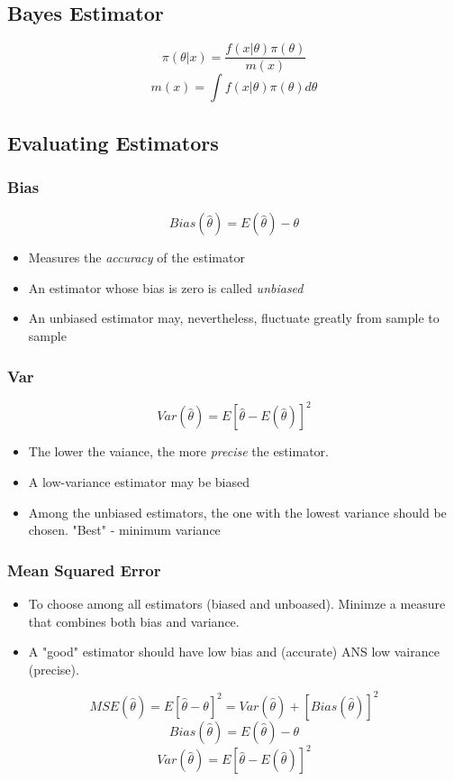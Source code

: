 \documentclass[12pt]{article}
\begin{document}
\subsection*{Bayes Estimator}
$$\pi(\theta|x)=\frac{f(x|\theta)\pi(\theta)}{m(x)}$$
$$m(x)=\int f(x|\theta)\pi(\theta)d\theta$$

\subsection*{Evaluating Estimators \cite{classnotes.18}}
\subsubsection*{Bias}
$$Bias(\hat{\theta})=E(\hat{\theta})-\theta$$

\begin{itemize}
\item Measures the \emph{accuracy} of the estimator
\item An estimator whose bias is zero is called \emph{unbiased}
\item An unbiased estimator may, nevertheless, fluctuate greatly from sample to sample
\end{itemize}

\subsubsection*{Var}
$$Var(\hat{\theta})=E{[\hat{\theta}-E(\hat{\theta})]^2}$$

\begin{itemize}
\item The lower the vaiance, the more \emph{precise} the estimator.
\item A low-variance estimator may be biased
\item Among the unbiased estimators, the one with the lowest variance should be chosen. "Best" - minimum variance
\end{itemize}

\subsubsection*{Mean Squared Error}
\begin{itemize}
\item To choose among all estimators (biased and unboased). Minimze a measure that combines both bias and variance.
\item A "good" estimator should have low bias and (accurate) ANS low vairance (precise).
\end{itemize}
$$MSE(\hat{\theta})=E{[\hat{\theta}-\theta]^2}=Var(\hat{\theta})+[Bias(\hat{\theta})]^2$$
$$Bias(\hat{\theta})=E(\hat{\theta})-\theta$$
$$Var(\hat{\theta})=E{[\hat{\theta}-E(\hat{\theta})]^2}$$
\end{document}
